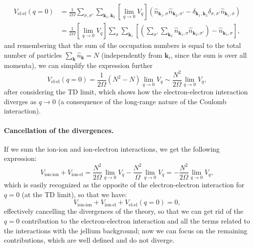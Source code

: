 \[
    \begin{aligned}
        V_{\text{el-el}}(q=0) & = \frac{1}{2\Omega} \sum_{\sigma, \sigma'} \sum_{\mathbf{k}_1, \mathbf{k}_2} \left[ \lim_{q \to 0} V_q \right] (\hat{n}_{\mathbf{k}_1, \sigma} \hat{n}_{\mathbf{k}_2, \sigma'} - \delta_{\mathbf{k}_1, \mathbf{k}_2} \delta_{\sigma, \sigma'} \hat{n}_{\mathbf{k}_1, \sigma}) \\
                              & = \frac{1}{2\Omega} \left[ \lim_{q \to 0} V_q \right] \sum_{\sigma} \sum_{\mathbf{k}_1} \left[ \left( \sum_{\sigma'} \sum_{\mathbf{k}_2} \hat{n}_{\mathbf{k}_1, \sigma} \hat{n}_{\mathbf{k}_2, \sigma'} \right) - \hat{n}_{\mathbf{k}_1, \sigma} \right],
    \end{aligned}
\]
and remembering that the sum of the occupation numbers is equal to the total number of particles \(\sum_{\mathbf{k}} \hat{n}_{\mathbf{k}} = N\) (independently from \(\mathbf{k}_i\), since the sum is over all momenta), we can simplify the expression further
\[
    V_{\text{el-el}}(q=0) = \frac{1}{2\Omega} (N^2 - N) \lim_{q \to 0} V_q \sim \frac{N^2}{2\Omega} \lim_{q \to 0} V_q,
\]
after considering the TD limit, which shows how the electron-electron interaction diverges as \(q \to 0\) (a consequence of the long-range nature of the Coulomb interaction).

\paragraph{Cancellation of the divergences.}
If we sum the ion-ion and ion-electron interactions, we get the following expression:
\[
    V_{\text{ion-ion}} + V_{\text{ion-el}} = \frac{N^2}{2 \Omega} \lim_{q \to 0} V_q - \frac{N^2}{\Omega} \lim_{q \to 0} V_q = -\frac{N^2}{2 \Omega} \lim_{q \to 0} V_q,
\]
which is easily recognized as the opposite of the electron-electron interaction for \(q=0\) (at the TD limit), so that we have:
\[
    V_{\text{ion-ion}} + V_{\text{ion-el}} + V_{\text{el-el}}(q=0) = 0,
\]
effectively cancelling the divergences of the theory, so that we can get rid of the \(q=0\) contribution to the electron-electron interaction and all the terms related to the interactions with the jellium background; now we can focus on the remaining contributions, which are well defined and do not diverge.

